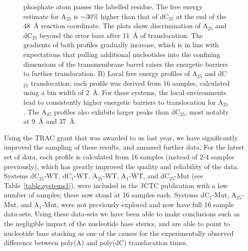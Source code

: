 \documentclass[a4paper,10pt]{article}
\newcommand{\dctf}{dC$_{25}$ }
\newcommand{\dctfnsp}{dC$_{25}$}
\newcommand{\atf}{A$_{25}$ }
\newcommand{\atfnsp}{A$_{25}$}
\newcommand{\dconsp}{dC$_{1}$}
\newcommand{\aonsp}{A$_{1}$}
\begin{document}
\begin{figure}[!h]
{phosphate atom passes the labelled residue. The free energy estimate for \atf is $\sim$30\% higher than that of \dctf at the end of the 48~{\AA} reaction coordinate. The plots show discrimination of \atf and \dctf beyond the error bars after 11~{\AA} of translocation. The gradients of both profiles gradually increase, which is in line with expectations that pulling additional nucleotides into the confining dimensions of the transmembrane barrel raises the energetic barriers to further translocation. B) Local free energy profiles of \atf and \dctf translocation; each profile was derived from 16 samples, calculated using a bin width of 2~{\AA}. For these systems, the local environments lead to consistently higher energetic barriers to translocation for \atfnsp. The \atf profiles also exhibits larger peaks than \dctfnsp, most notably at 9~{\AA} and 37~{\AA}.}
  \label{full_trans_local}
\end{figure}

Using the TRAC grant that was awarded to us last year, we have significantly improved the sampling of these results, and amassed further data. For the latest set of data, each profile is calculated from 16 samples (instead of 2-4 samples previously), which has greatly improved the quality and reliability of the data. Systems \dctfnsp-WT,  \dconsp-WT, \atfnsp-WT,  \aonsp-WT,  and \dctfnsp-Mut (see Table~\ref{table:systems1}), were included in the JCTC publication with a low number of samples; these now stand at 16 samples each. Systems \dconsp-Mut, \atfnsp-Mut, and \aonsp-Mut, were not previously explored and now have full 16 sample data-sets. Using these data-sets we have been able to make conclusions such as the negligible impact of the nucleotide base sterics, and are able to point to nucleotide base stacking as  one of the causes for the experimentally observed difference between poly(A) and poly(dC) translocation times.
\end{document}

